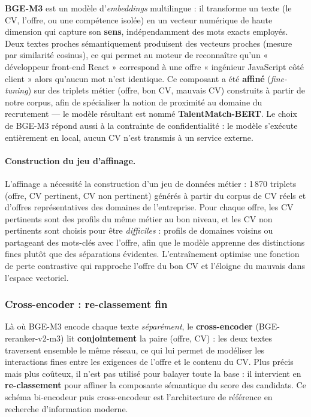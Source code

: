 \documentclass[12pt,a4paper]{report}
\begin{document}
\textbf{BGE-M3} est un modèle d'\textit{embeddings} multilingue : il transforme un texte (le CV, l'offre, ou une compétence isolée) en un vecteur numérique de haute dimension qui capture son \textbf{sens}, indépendamment des mots exacts employés. Deux textes proches sémantiquement produisent des vecteurs proches (mesure par similarité cosinus), ce qui permet au moteur de reconnaître qu'un « développeur front-end React » correspond à une offre « ingénieur JavaScript côté client » alors qu'aucun mot n'est identique. Ce composant a été \textbf{affiné} (\textit{fine-tuning}) sur des triplets métier (offre, bon CV, mauvais CV) construits à partir de notre corpus, afin de spécialiser la notion de proximité au domaine du recrutement --- le modèle résultant est nommé \textbf{TalentMatch-BERT}. Le choix de BGE-M3 répond aussi à la contrainte de confidentialité : le modèle s'exécute entièrement en local, aucun CV n'est transmis à un service externe.

\paragraph{Construction du jeu d'affinage.} L'affinage a nécessité la construction d'un jeu de données métier : 1\,870 triplets (offre, CV pertinent, CV non pertinent) générés à partir du corpus de CV réels et d'offres représentatives des domaines de l'entreprise. Pour chaque offre, les CV pertinents sont des profils du même métier au bon niveau, et les CV non pertinents sont choisis pour être \textit{difficiles} : profils de domaines voisins ou partageant des mots-clés avec l'offre, afin que le modèle apprenne des distinctions fines plutôt que des séparations évidentes. L'entraînement optimise une fonction de perte contrastive qui rapproche l'offre du bon CV et l'éloigne du mauvais dans l'espace vectoriel.

\subsubsection{Cross-encoder : re-classement fin}

Là où BGE-M3 encode chaque texte \textit{séparément}, le \textbf{cross-encoder} (BGE-reranker-v2-m3) lit \textbf{conjointement} la paire (offre, CV) : les deux textes traversent ensemble le même réseau, ce qui lui permet de modéliser les interactions fines entre les exigences de l'offre et le contenu du CV. Plus précis mais plus coûteux, il n'est pas utilisé pour balayer toute la base : il intervient en \textbf{re-classement} pour affiner la composante sémantique du score des candidats. Ce schéma bi-encodeur puis cross-encodeur est l'architecture de référence en recherche d'information moderne.
\end{document}
